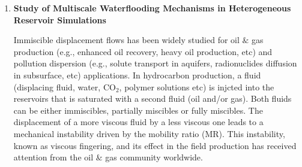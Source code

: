 \documentclass[12pts,a4paper,amsmath,amssymb,floatfix]{article}%
\newcommand{\all}{MSc O$\&$GE, PetE, UG Chem/Mech/Pet Engineering}
\begin{document}
\begin{enumerate}[label=\bfseries Project: \arabic*:]
\noindent
{\bf Specifics:} 
\begin{enumerate}
\item Computational, theoretical and review (\all) -- 1 student. 
\item The student is required to develop an initial thermodynamic solid-liquid-vapour equilibrium (SLVE) formulation;
\item This formulation will be `translated' into a code (e.g., Matlab, Python etc) and coupled with a optimisation software to assess its initial reliability/accuracy.
\end{enumerate}

{\bf References:}
\begin{itemize}
\item Ahmadi et al. (2007) `Natural gas production from hydrate dissociation: An axisymmetric model', Journal of Petroleum Science and Engineering, 58:245-258;
\item Sloan (1998) `Clathrate Hydrates of Natural Gases', M. Dekker (Publisher);
\item Jager et al. (2003) `The next generation of hydrate prediction - II. Dedicated aqueous phase fugacity model for hydrate prediction', Fluid Phase Equilibria, 211:85-107;
\item Carrol (2003) `Natural Gas Hydrates: A Guide for Engineers', Gulf Professional Publishing.
\end{itemize}

\clearpage

\item {\bf Study of Multiscale Waterflooding Mechanisms in Heterogeneous Reservoir Simulations}

Immiscible displacement flows has been widely studied for oil $\&$ gas production (e.g., enhanced oil recovery, heavy oil production, etc) and pollution dispersion (e.g., solute transport in aquifers, radionuclides diffusion in subsurface, etc) applications. In hydrocarbon production, a fluid (displacing fluid, water, CO$_{2}$, polymer solutions etc) is injcted into the reservoirs that is saturated with a second fluid (oil and/or gas). Both fluids can be either immiscibles, partially miscibles or fully miscibles. The displacement of a more viscous fluid by a less viscous one leads to a mechanical instability driven by the mobility ratio (MR). This instability, known as viscous fingering, and its effect in the field production has received attention from the oil $\&$ gas community worldwide.


\end{enumerate}
\end{document}
